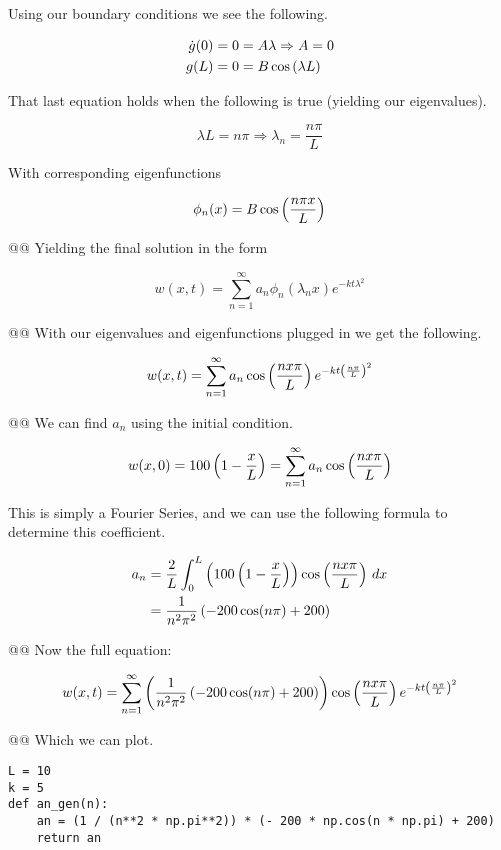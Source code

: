 \documentclass[10pt]{article}
\begin{document}
\begin{easylist}[enumerate]
    Using our boundary conditions we see the following.

    \begin{align*}
        \dot{g}(0) &= 0 = A \lambda \Rightarrow A = 0\\
        g(L) &= 0 = B \cos\left( \lambda L \right)\\
    \end{align*}

    That last equation holds when the following is true (yielding our eigenvalues).

    \[
        \lambda L = n \pi \Rightarrow \lambda_n = \frac{n \pi}{L}
    \]

    With corresponding eigenfunctions

    \[
        \phi_n(x) = B \cos\left( \frac{n\pi x}{L} \right)
    \]

    @@ Yielding the final solution in the form

    \[
        w(x, t) = \sum_{n=1}^\infty a_n \phi_n(\lambda_n x)e^{-kt\lambda^2}
    \]

    @@ With our eigenvalues and eigenfunctions plugged in we get the following.

    \[
        w(x, t) = \sum_{n=1}^\infty a_n \cos\left( \frac{nx\pi}{L} \right)e^{-kt\left( \frac{n\pi}{L} \right)^2}
    \]

    @@ We can find $a_n$ using the initial condition.

    \[
        w(x, 0) = 100 \left( 1 - \frac{x}{L} \right) = \sum_{n=1}^\infty a_n \cos\left( \frac{nx\pi}{L} \right)
    \]

    This is simply a Fourier Series, and we can use the following formula to determine this coefficient.

    \begin{align*}
        a_n &= \frac{2}{L} \int_0^L \left( 100 \left( 1 - \frac{x}{L} \right) \right) \cos\left( \frac{nx\pi}{L} \right) \, dx\\
        &= \frac{1}{n^2\pi^2} \left( -200\cos(n\pi) + 200 \right)
    \end{align*}

    @@ Now the full equation:

    \[
        w(x, t) = \sum_{n=1}^\infty \left( \frac{1}{n^2\pi^2} \left( -200\cos(n\pi) + 200 \right) \right) \cos\left( \frac{nx\pi}{L} \right)e^{-kt\left( \frac{n\pi}{L} \right)^2}
    \]

    @@ Which we can plot.

\weave

\begin{verbatim}
L = 10
k = 5
def an_gen(n):
    an = (1 / (n**2 * np.pi**2)) * (- 200 * np.cos(n * np.pi) + 200)
    return an


\end{verbatim}
\end{easylist}
\end{document}

